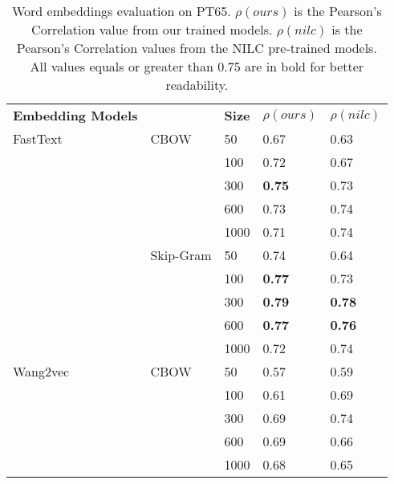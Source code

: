 \begin{table}[]
\caption{Word embeddings evaluation on PT65. \textbf{$\rho(ours)$} is the Pearson’s Correlation value from our trained models. \textbf{$\rho(nilc)$} is the Pearson’s Correlation values from the NILC pre-trained models. All values equals or greater than 0.75 are in bold for better readability.}
\label{tab:evaluation:we}
\centering%
\begin{minipage}{.65\textwidth}
\begin{tabular}{@{}lllll@{}}
\cmidrule(r){1-5}
\textbf{Embedding Models} &      & \textbf{Size} & \textbf{$\rho(ours)$} & \textbf{$\rho(nilc)$} \\ \cmidrule(r){1-5}
FastText            & CBOW          & 50   & 0.67             & 0.63            \\
                    &               & 100  & 0.72             & 0.67            \\
                    &               & 300  & \textbf{0.75}    & 0.73            \\
                    &               & 600  & 0.73             & 0.74            \\
                    &               & 1000 & 0.71             & 0.74            \\ \cmidrule(lr){2-5}
                    & Skip-Gram     & 50   & 0.74             & 0.64            \\
                    &               & 100  & \textbf{0.77}    & 0.73            \\
                    &               & 300  & \textbf{0.79}    & \textbf{0.78}   \\
                    &               & 600  & \textbf{0.77}    & \textbf{0.76}   \\
                    &               & 1000 & 0.72             & 0.74            \\ \cmidrule(r){1-5}
Wang2vec            & CBOW          & 50   & 0.57             & 0.59            \\
                    &               & 100  & 0.61             & 0.69            \\
                    &               & 300  & 0.69             & 0.74            \\
                    &               & 600  & 0.69             & 0.66            \\
                    &               & 1000 & 0.68             & 0.65            \\ \cmidrule(lr){2-5}

\end{tabular}
\end{minipage}
\end{table}
